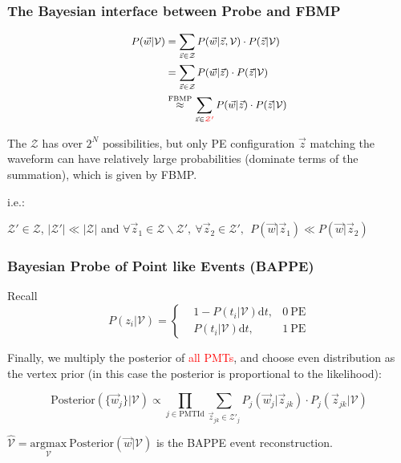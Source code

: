 \documentclass{beamer}
\newcommand{\dd}{\mathrm{d}}
\begin{document}
\begin{frame}
    \frametitle{The Bayesian interface between Probe and FBMP}
    
    \begin{equation}
        \small
        \begin{aligned}
            P(\vec{w}|\mathcal{V}) & = \sum_{\vec{z} \in \mathcal{Z}} P(\vec{w}|\vec{z},\mathcal{V}) \cdot P(\vec{z}|\mathcal{V}) \\
            & = \sum_{\vec{z} \in \mathcal{Z}} P(\vec{w}|\vec{z}) \cdot P(\vec{z}|\mathcal{V}) \\
            & \overset{\text{FBMP}}{\approx} \sum_{\vec{z} \in \textcolor{red}{\mathcal{Z}'}} P(\vec{w}|\vec{z}) \cdot P(\vec{z}|\mathcal{V})
        \end{aligned}
    \end{equation}
    
    The $\mathcal{Z}$ has over $2^N$ possibilities, but only PE configuration $\vec{z}$ matching the waveform can have relatively large probabilities (dominate terms of the summation), which is given by FBMP. 

    i.e.: 

    $\mathcal{Z}' \in \mathcal{Z}$, $|\mathcal{Z}'| \ll |\mathcal{Z}|$ and $\forall \vec{z}_1 \in \mathcal{Z} \backslash \mathcal{Z}',\ \forall \vec{z}_2 \in \mathcal{Z}' ,\ \ P(\vec{w}|\vec{z}_1) \ll P(\vec{w}|\vec{z}_2)$
\end{frame}

\begin{frame}
    \frametitle{Bayesian Probe of Point like Events (BAPPE)}
    
    Recall 
    \begin{equation*}
        P({z}_i|\mathcal{V}) = \left\{ 
            \begin{aligned}
                & 1-P(t_i|\mathcal{V}) \dd t, & 0\ \mathrm{PE} \\
                & P(t_i|\mathcal{V}) \dd t , & 1\ \mathrm{PE}
            \end{aligned}
        \right.
    \end{equation*}

    Finally, we multiply the posterior of \textcolor{red}{all PMTs}, and choose even distribution as the vertex prior (in this case the posterior is proportional to the likelihood):

    \begin{equation}
        \mathrm{Posterior}(\{\vec{w}_j\}|\mathcal{V}) \propto \prod_{j \in {\mathrm{PMTId}}} \sum_{\vec{z}_{jk} \in \mathcal{Z}'_j} P_j(\vec{w}_j|\vec{z}_{jk}) \cdot P_j(\vec{z}_{jk}|\mathcal{V})
        \label{eq:4}
    \end{equation}

    $\hat{\mathcal{V}}=\underset{\mathcal{V}}{\mathrm{argmax}}\ \mathrm{Posterior}(\vec{w}|\mathcal{V})$ is the BAPPE event reconstruction. 
\end{frame}
\end{document}
